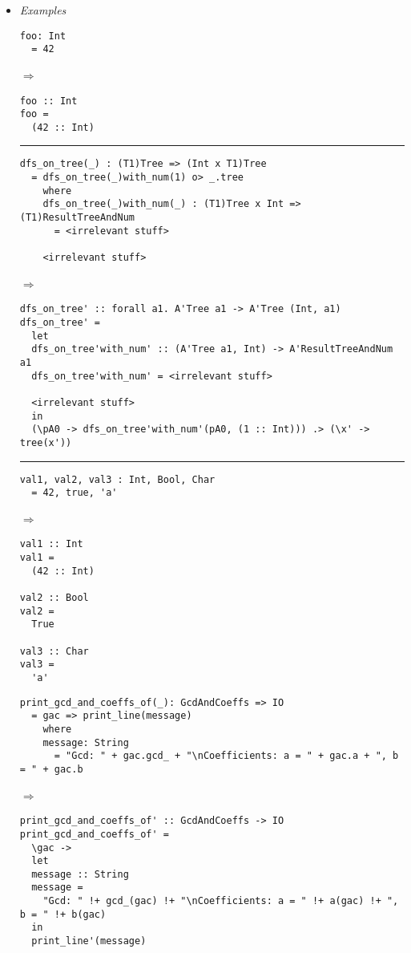 \documentclass{article}
\def\lra{$\Longrightarrow$\ }
\begin{document}
\begin{itemize}
\item
\textit{Examples}
\begin{verbatim}
foo: Int
  = 42
\end{verbatim}
\lra
\begin{verbatim}
foo :: Int
foo =
  (42 :: Int)
\end{verbatim}

\rule{\linewidth}{0.1pt}

\begin{verbatim}
dfs_on_tree(_) : (T1)Tree => (Int x T1)Tree
  = dfs_on_tree(_)with_num(1) o> _.tree
    where
    dfs_on_tree(_)with_num(_) : (T1)Tree x Int => (T1)ResultTreeAndNum
      = <irrelevant stuff>

    <irrelevant stuff>
\end{verbatim} \lra
\begin{verbatim}
dfs_on_tree' :: forall a1. A'Tree a1 -> A'Tree (Int, a1)
dfs_on_tree' =
  let
  dfs_on_tree'with_num' :: (A'Tree a1, Int) -> A'ResultTreeAndNum a1
  dfs_on_tree'with_num' = <irrelevant stuff>

  <irrelevant stuff>
  in
  (\pA0 -> dfs_on_tree'with_num'(pA0, (1 :: Int))) .> (\x' -> tree(x'))
\end{verbatim}

\rule{\linewidth}{0.1pt}

\begin{verbatim}
val1, val2, val3 : Int, Bool, Char
  = 42, true, 'a'
\end{verbatim} \lra
\begin{verbatim}
val1 :: Int
val1 =
  (42 :: Int)

val2 :: Bool
val2 =
  True

val3 :: Char
val3 =
  'a'
\end{verbatim}

\newpage

\begin{verbatim}
print_gcd_and_coeffs_of(_): GcdAndCoeffs => IO
  = gac => print_line(message)
    where
    message: String
      = "Gcd: " + gac.gcd_ + "\nCoefficients: a = " + gac.a + ", b = " + gac.b
\end{verbatim}
\lra
\begin{verbatim}
print_gcd_and_coeffs_of' :: GcdAndCoeffs -> IO
print_gcd_and_coeffs_of' =
  \gac ->
  let
  message :: String
  message =
    "Gcd: " !+ gcd_(gac) !+ "\nCoefficients: a = " !+ a(gac) !+ ", b = " !+ b(gac)
  in
  print_line'(message)
\end{verbatim}


\end{itemize}
\end{document}
